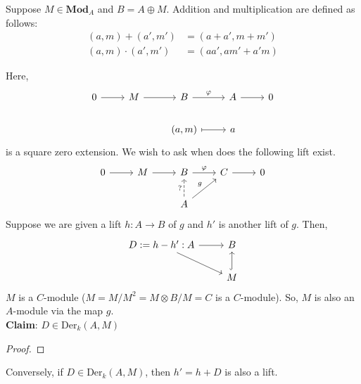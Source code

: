 \documentclass[oneside, 12pt]{scrbook}
\theoremstyle{theorem}
\begin{document}
\begin{example}
Suppose $M \in \mathbf{Mod}_{A}$ and $B = A \oplus M$. Addition and multiplication are defined as follows: 
\begin{align*}
(a,m) + (a',m') &= (a+a', m + m')\\
(a,m) \cdot (a',m') &= (aa' , am' + a'm)
\end{align*}

Here, 
\[\begin{tikzcd}
	0 & M & B & A & 0 \\
	&& {(a,m)} & a
	\arrow[from=1-1, to=1-2]
	\arrow[from=1-2, to=1-3]
	\arrow["\varphi", from=1-3, to=1-4]
	\arrow[from=1-4, to=1-5]
	\arrow[maps to, from=2-3, to=2-4]
\end{tikzcd}\]
is a square zero extension. We wish to ask when does the following lift exist. 
 \[\begin{tikzcd}
	0 & M & B & C & 0 \\
	&& A
	\arrow[from=1-1, to=1-2]
	\arrow[from=1-2, to=1-3]
	\arrow["\varphi", from=1-3, to=1-4]
	\arrow[from=1-4, to=1-5]
	\arrow["g", from=2-3, to=1-4]
	\arrow["{?}", dashed, from=2-3, to=1-3]
\end{tikzcd}\]
Suppose we are given a lift $h: A \rightarrow B$ of $g$ and $h'$ is another lift of $g$. Then, 
\[\begin{tikzcd}
	{D:= h-h' :A} & B \\
	& M
	\arrow[from=1-1, to=1-2]
	\arrow[from=1-1, to=2-2]
	\arrow[hook, from=2-2, to=1-2]
\end{tikzcd}\]
$M$ is a $C$-module ($M = M/M^2 = M \otimes B/M = C$ is a $C$-module). So, $M$ is also an $A$-module via the map $g$. \\

\textbf{Claim}: $D \in \mathrm{Der}_{k}(A,M)$ \\
\begin{proof}

\end{proof}
Conversely, if $D \in \mathrm{Der}_{k}(A,M)$, then $h' = h + D$ is also a lift. 
\end{example}
\end{document}
